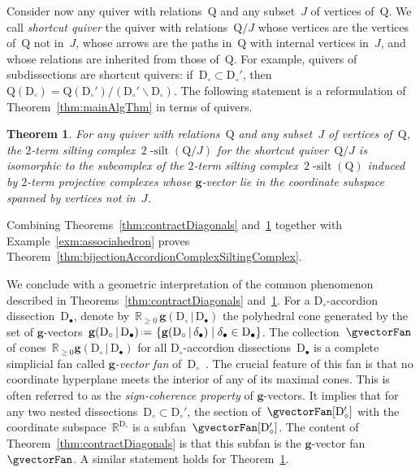 \documentclass{amsart}
\newtheorem{theorem}{Theorem}%
\theoremstyle{definition}
\newcommand{\R}{\mathbb{R}} %
\renewcommand{\b}[1]{\mathbf{#1}} %
\newcommand{\set}[2]{\left\{ #1 \;\middle|\; #2 \right\}} %
\newcommand{\ssm}{\smallsetminus} %
\newcommand{\eqdef}{\mbox{\,\raisebox{0.2ex}{\scriptsize\ensuremath{\mathrm:}}\ensuremath{=}\,}} %
\newcommand{\darkblue}{\color{darkblue}} %
\newcommand{\defn}[1]{\textsl{\darkblue #1}} %
\newcommand{\vincent}[1]{\todo[color=blue!30]{#1 \\ \hfill --- V.}}
\newcommand{\dissection}{\mathrm{D}} %
\newcommand{\gvector}[2]{\mathbf{g}(#1 \,|\, #2)} %
\newcommand{\quiver}{\mathrm{Q}} %
\newcommand{\silt}{2 \! \operatorname{-silt}}
\begin{document}
Consider now any quiver with relations~$\quiver$ and any subset~$J$ of vertices of~$\quiver$.
We call \defn{shortcut quiver} the quiver with relations~$\quiver/J$ whose vertices are the vertices of~$\quiver$ not in~$J$, whose arrows are the paths in~$\quiver$ with internal vertices in~$J$, and whose relations are inherited from those of~$\quiver$.
For example, quivers of subdissections are shortcut quivers: if~$\dissection_\circ \subset \dissection_\circ'$, then~${\quiver(\dissection_\circ) = \quiver(\dissection_\circ')/(\dissection_\circ' \ssm \dissection_\circ)}$.
The following statement is a reformulation of Theorem~\ref{thm:mainAlgThm} in terms of quivers.
\vincent{Not really}

\begin{theorem}
\label{thm:contractVertices}
For any quiver with relations~$\quiver$ and any subset~$J$ of vertices of~$\quiver$, the $2$-term silting complex~$\silt(\quiver/J)$ for the shortcut quiver~$\quiver/J$ is isomorphic to the subcomplex of the $2$-term silting complex~$\silt(\quiver)$ induced by $2$-term projective complexes whose $\b{g}$-vector lie in the coordinate subspace spanned by vertices not in~$J$.
\end{theorem}

Combining Theorems~\ref{thm:contractDiagonals} and~\ref{thm:contractVertices} together with Example~\ref{exm:associahedron} proves Theorem~\ref{thm:bijectionAccordionComplexSiltingComplex}.

We conclude with a geometric interpretation of the common phenomenon described in Theorems~\ref{thm:contractDiagonals} and~\ref{thm:contractVertices}.
For a $\dissection_\circ$-accordion dissection~$\dissection_\bullet$, denote by~$\R_{\ge0}\,\gvector{\dissection_\circ}{\dissection_\bullet}$ the polyhedral cone generated by the set of $\b{g}$-vectors~$\gvector{\dissection_\circ}{\dissection_\bullet} \eqdef \set{\gvector{\dissection_\circ}{\delta_\bullet}}{\delta_\bullet \in \dissection_\bullet}$. The collection~$\gvectorFan$ of cones~$\R_{\ge0}\gvector{\dissection_\circ}{\dissection_\bullet}$ for all $\dissection_\circ$-accordion dissections~$\dissection_\bullet$
is a complete simplicial fan called \defn{$\b{g}$-vector fan} of~$\dissection_\circ$~\cite{MannevillePilaud-accordion}.
The crucial feature of this fan is that no coordinate hyperplane meets the interior of any of its maximal cones.
This is often referred to as the \defn{sign-coherence property} of $\b{g}$-vectors.
It implies that for any two nested dissections~$\dissection_\circ \subset \dissection_\circ'$, the section of~$\gvectorFan[\dissection_\circ']$ with the coordinate subspace~$\R^{\dissection_\circ}$ is a subfan~$\gvectorFan[\dissection_\circ']$.
The content of Theorem~\ref{thm:contractDiagonals} is that this subfan is the $\b{g}$-vector fan~$\gvectorFan$.
A similar statement holds for Theorem~\ref{thm:contractVertices}.
\end{document}
